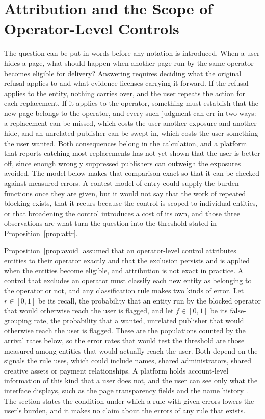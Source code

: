 \documentclass[11pt]{article}
\theoremstyle{definition}
\begin{document}
\section{Attribution and the Scope of Operator-Level Controls}

The question can be put in words before any notation is introduced. When a user hides a page, what should happen when another page run by the same operator becomes eligible for delivery? Answering requires deciding what the original refusal applies to and what evidence licenses carrying it forward. If the refusal applies to the entity, nothing carries over, and the user repeats the action for each replacement. If it applies to the operator, something must establish that the new page belongs to the operator, and every such judgment can err in two ways: a replacement can be missed, which costs the user another exposure and another hide, and an unrelated publisher can be swept in, which costs the user something the user wanted. Both consequences belong in the calculation, and a platform that reports catching most replacements has not yet shown that the user is better off, since enough wrongly suppressed publishers can outweigh the exposures avoided. The model below makes that comparison exact so that it can be checked against measured errors. A contest model of entry could supply the burden functions once they are given, but it would not say that the work of repeated blocking exists, that it recurs because the control is scoped to individual entities, or that broadening the control introduces a cost of its own, and those three observations are what turn the question into the threshold stated in Proposition~\ref{prop:attr}.

Proposition~\ref{prop:avoid} assumed that an operator-level control attributes entities to their operator exactly and that the exclusion persists and is applied when the entities become eligible, and attribution is not exact in practice. A control that excludes an operator must classify each new entity as belonging to the operator or not, and any classification rule makes two kinds of error. Let $r\in[0,1]$ be its recall, the probability that an entity run by the blocked operator that would otherwise reach the user is flagged, and let $f\in[0,1]$ be its false-grouping rate, the probability that a wanted, unrelated publisher that would otherwise reach the user is flagged. These are the populations counted by the arrival rates below, so the error rates that would test the threshold are those measured among entities that would actually reach the user. Both depend on the signals the rule uses, which could include names, shared administrators, shared creative assets or payment relationships. A platform holds account-level information of this kind that a user does not, and the user can see only what the interface displays, such as the page transparency fields and the name history \cite{meta2019}. The section states the condition under which a rule with given errors lowers the user's burden, and it makes no claim about the errors of any rule that exists.
\end{document}
